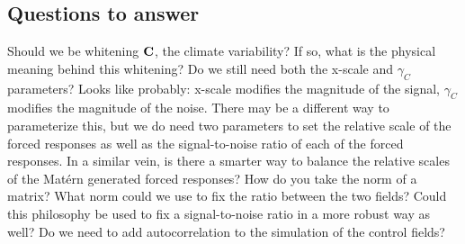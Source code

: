 \documentclass[11pt]{article}
\newcommand{\C}{\ensuremath{\text{Cov}}}
\def\C{\textbf{\text{C}}}
\begin{document}
\subsection{Questions to answer}
\begin{outline}
\1 Should we be whitening $\C$, the climate variability? If so, what is the physical meaning behind this whitening?
\1 Do we still need both the x-scale and $\gamma_C$ parameters? Looks like probably: x-scale modifies the magnitude of the signal, $\gamma_C$ modifies the magnitude of the noise. There may be a different way to parameterize this, but we do need two parameters to set the relative scale of the forced responses as well as the signal-to-noise ratio of each of the forced responses.
\2 In a similar vein, is there a smarter way to balance the relative scales of the Mat\'ern generated forced responses? How do you take the norm of a matrix? What norm could we use to fix the ratio between the two fields?
\2 Could this philosophy be used to fix a signal-to-noise ratio in a more robust way as well?
\1 Do we need to add autocorrelation to the simulation of the control fields?
\end{outline}
\end{document}
